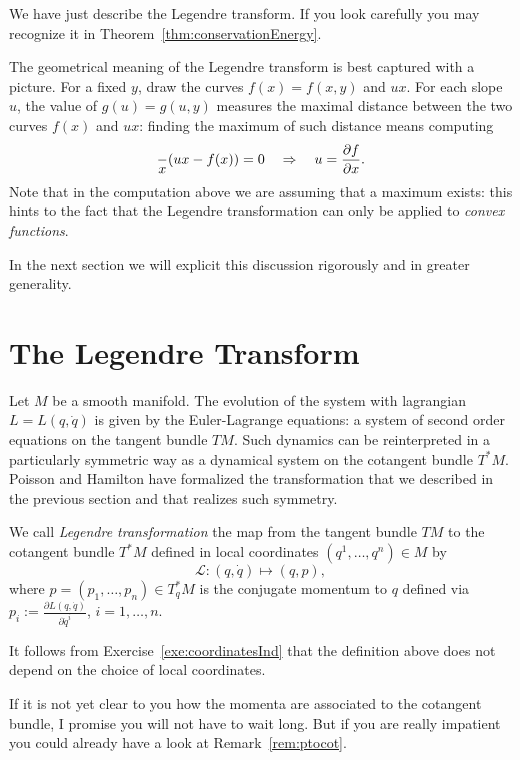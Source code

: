 \documentclass[english,fontsize=11pt,paper=a5,oneside]{scrbook}
\newcommand{\cL}{\mathcal{L}}
\let\d\relax
\DeclareMathOperator{\d}{d}
\theoremstyle{definition}
\begin{document}
We have just describe the Legendre transform.
If you look carefully you may recognize it in Theorem~\ref{thm:conservationEnergy}.

The geometrical meaning of the Legendre transform is best captured with a picture.
For a fixed $y$, draw the curves $f(x) = f(x,y)$ and $ux$. 
For each slope $u$, the value of $g(u) = g(u,y)$ measures the maximal distance between the two curves $f(x)$ and $ux$: finding the maximum of such distance means
computing
\begin{equation}
    \frac{\d}{\d x}(ux - f(x)) = 0 \quad\Rightarrow\quad u = \frac{\partial f}{\partial x}.
\end{equation}
Note that in the computation above we are assuming that a maximum exists:
this hints to the fact that the Legendre transformation can only be applied to \emph{convex functions}.

In the next section we will explicit this discussion rigorously and in greater generality.

\section{The Legendre Transform}

Let $M$ be a smooth manifold.
The evolution of the system with lagrangian $L=L(q,\dot q)$ is given by the Euler-Lagrange equations: a system of second order equations on the tangent bundle $TM$.
Such dynamics can be reinterpreted in a particularly symmetric way as a dynamical system on the cotangent bundle $T^*M$.
Poisson and Hamilton have formalized the transformation that we described in the previous section and that realizes such symmetry.

\begin{tcolorbox}
    We call \emph{Legendre transformation} the map from the tangent bundle $TM$ to the cotangent bundle $T^*M$ defined in local coordinates $(q^1, \ldots, q^n)\in M$ by 
    \begin{equation}\label{eq:legrendreTrafo}
        \cL: (q,\dot q) \mapsto (q,p),
    \end{equation}
    where $p = (p_1, \ldots, p_n) \in T^*_q M$ is the conjugate momentum to $q$ defined via $p_i := \frac{\partial L(q,\dot q)}{\partial \dot q^i}$, $i=1,\ldots,n$.
\end{tcolorbox}
It follows from Exercise~\ref{exe:coordinatesInd} that the definition above does not depend on the choice of local coordinates.

If it is not yet clear to you how the momenta are associated to the cotangent bundle, I promise you will not have to wait long. But if you are really impatient you could already have a look at Remark~\ref{rem:ptocot}.
\end{document}
